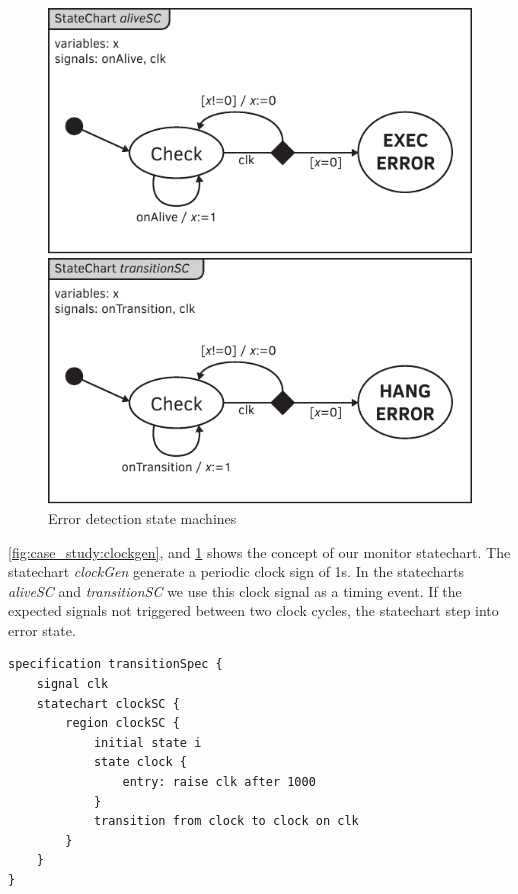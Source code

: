 \begin{figure}[h]
	\centering
	\begin{minipage}{0.49\linewidth}
		\includegraphics[width=0.9\linewidth]{include/figures/chapter_6/statecharts/onalive}
	\end{minipage}
	\begin{minipage}{0.49\linewidth}
		\includegraphics[width=0.9\linewidth]{include/figures/chapter_6/statecharts/ontransition}
	\end{minipage}
	\caption{Error detection state machines}
	\label{fig:case_study:errors}
\end{figure}

\cref{fig:case_study:clockgen}, and \cref{fig:case_study:errors} shows the concept of our monitor statechart. The statechart \emph{clockGen} generate a periodic clock sign of 1\si{\second}. In the statecharts \emph{aliveSC} and \emph{transitionSC} we use this clock signal as a timing event. If the expected signals not triggered between two clock cycles, the statechart step into error state.

\begin{lstlisting}[caption={Statechart representation of clock generation},label=lst:case_study:clk_gen]
specification transitionSpec {
    signal clk
    statechart clockSC {
        region clockSC {
            initial state i
            state clock {
                entry: raise clk after 1000
            }
            transition from clock to clock on clk
        }
    }
}
\end{lstlisting}

